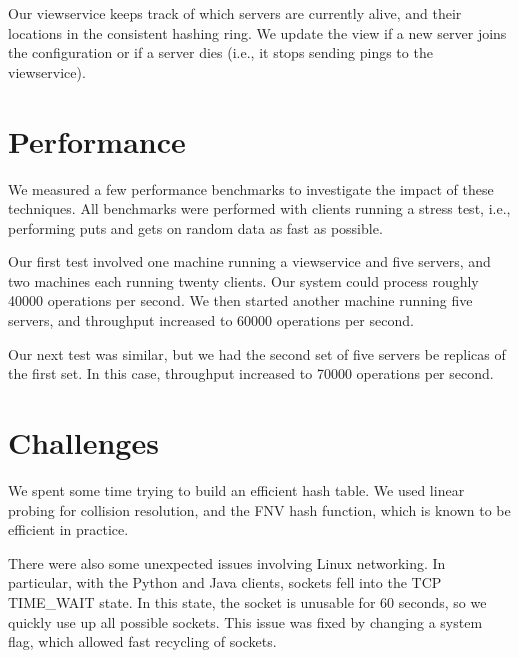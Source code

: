 \documentclass[letterpaper,8pt]{article}
\begin{document}
     Our viewservice keeps track of which servers are currently alive, and their locations in the consistent hashing ring.
     We update the view if a new server joins the configuration or if a server dies (i.e., it stops sending pings to the viewservice).

     \section{Performance}
     We measured a few performance benchmarks to investigate the impact of these techniques.
     All benchmarks were performed with clients running a stress test, i.e., performing puts and gets on random data as fast as possible.

     Our first test involved one machine running a viewservice and five servers, and two machines each running twenty clients.
     Our system could process roughly 40000 operations per second.
     We then started another machine running five servers, and throughput increased to 60000 operations per second.

     Our next test was similar, but we had the second set of five servers be replicas of the first set.
     In this case, throughput increased to 70000 operations per second.

     \section{Challenges}
     We spent some time trying to build an efficient hash table.
     We used linear probing for collision resolution, and the FNV hash function, which is known to be efficient in practice.

     There were also some unexpected issues involving Linux networking.
     In particular, with the Python and Java clients, sockets fell into the TCP TIME\_WAIT state.
     In this state, the socket is unusable for 60 seconds, so we quickly use up all possible sockets.
     This issue was fixed by changing a system flag, which allowed fast recycling of sockets.



\end{document}
